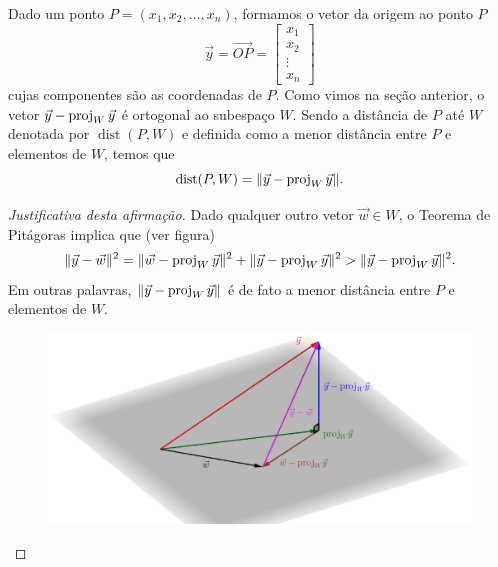 \noindent Dado um ponto $P = (x_1, x_2, \dots, x_n)$, formamos o vetor da origem ao ponto $P$
\begin{equation}
\vec{y} = \vec{OP} =
\begin{bmatrix}
x_1 \\ x_2 \\ \vdots \\ x_n
\end{bmatrix}
\end{equation} cujas componentes são as coordenadas de $P$. Como vimos na seção anterior, o vetor $\vec{y} - \operatorname{proj}_{W} \vec{y}$ é ortogonal ao subespaço $W$. Sendo a distância de $P$ até $W$ denotada por $\operatorname{dist} (P,W)$ e definida como a menor distância entre $P$ e elementos de $W$, temos que
\begin{equation}
\operatorname{dist} (P,W) = \|\vec{y} - \operatorname{proj}_{W} \vec{y}\|.
\end{equation}


\begin{proof}[Justificativa desta afirmação]
Dado qualquer outro vetor $\vec{w} \in W$, o Teorema de Pitágoras implica que (ver figura)
\begin{equation}
\| \vec{y} - \vec{w} \|^2 = \| \vec{w} - \operatorname{proj}_{W} \vec{y}\|^2 + \| \vec{y} - \operatorname{proj}_{W} \vec{y}\|^2 > \| \vec{y} - \operatorname{proj}_{W} \vec{y}\|^2.
\end{equation} Em outras palavras, $\|\vec{y} - \operatorname{proj}_{W} \vec{y}\|$ é de fato a menor distância entre $P$ e elementos de $W$.
\begin{figure}[h!]
\begin{center}
\includegraphics[width=1\linewidth]{Semana12/semana12-dist-justif}
\end{center}
\end{figure}
\end{proof}


